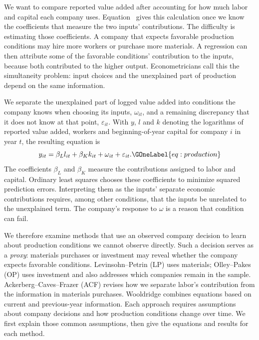 We want to compare reported value added after accounting for how much labor and capital each company uses. Equation~ gives this calculation once we know the coefficients that measure the two inputs' contributions. The difficulty is estimating those coefficients. A company that expects favorable production conditions may hire more workers or purchase more materials. A regression can then attribute some of the favorable conditions' contribution to the inputs, because both contributed to the higher output. Econometricians call this the simultaneity problem: input choices and the unexplained part of production depend on the same information.

We separate the unexplained part of logged value added into conditions the company knows when choosing its inputs, $\omega_{it}$, and a remaining discrepancy that it does not know at that point, $\varepsilon_{it}$. With $y$, $l$ and $k$ denoting the logarithms of reported value added, workers and beginning-of-year capital for company $i$ in year $t$, the resulting equation is
\begin{equation}
y_{it}=\beta_Ll_{it}+\beta_Kk_{it}+\omega_{it}+\varepsilon_{it}.
\GOneLabel{eq:production}
\end{equation}
The coefficients $\beta_L$ and $\beta_K$ measure the contributions assigned to labor and capital. Ordinary least squares chooses these coefficients to minimize squared prediction errors. Interpreting them as the inputs' separate economic contributions requires, among other conditions, that the inputs be unrelated to the unexplained term. The company's response to $\omega$ is a reason that condition can fail.

We therefore examine methods that use an observed company decision to learn about production conditions we cannot observe directly. Such a decision serves as a \emph{proxy}: materials purchases or investment may reveal whether the company expects favorable conditions. Levinsohn--Petrin (LP) uses materials; Olley--Pakes (OP) uses investment and also addresses which companies remain in the sample. Ackerberg--Caves--Frazer (ACF) revises how we separate labor's contribution from the information in materials purchases. Wooldridge combines equations based on current and previous-year information. Each approach requires assumptions about company decisions and how production conditions change over time. We first explain those common assumptions, then give the equations and results for each method.

